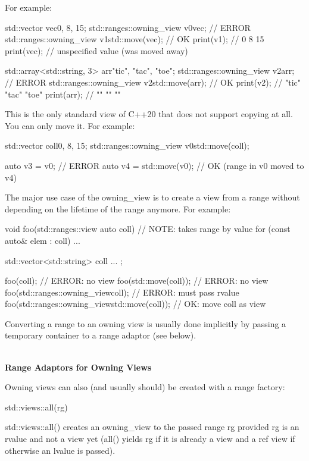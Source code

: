 For example:

\begin{cpp}
std::vector vec{0, 8, 15};
std::ranges::owning_view v0{vec}; // ERROR
std::ranges::owning_view v1{std::move(vec)}; // OK
print(v1); // 0 8 15
print(vec); // unspecified value (was moved away)

std::array<std::string, 3> arr{"tic", "tac", "toe"};
std::ranges::owning_view v2{arr}; // ERROR
std::ranges::owning_view v2{std::move(arr)}; // OK
print(v2); // "tic" "tac" "toe"
print(arr); // "" "" ""
\end{cpp}

This is the only standard view of C++20 that does not support copying at all. You can only move it. For example:

\begin{cpp}
std::vector coll{0, 8, 15};
std::ranges::owning_view v0{std::move(coll)};

auto v3 = v0; // ERROR
auto v4 = std::move(v0); // OK (range in v0 moved to v4)
\end{cpp}

The major use case of the owning\_view is to create a view from a range without depending on the lifetime of the range anymore. For example:

\begin{cpp}
void foo(std::ranges::view auto coll) // NOTE: takes range by value
{
	for (const auto& elem : coll) {
		...
	}
}

std::vector<std::string> coll{ ... };

foo(coll); // ERROR: no view
foo(std::move(coll)); // ERROR: no view
foo(std::ranges::owning_view{coll}); // ERROR: must pass rvalue
foo(std::ranges::owning_view{std::move(coll)}); // OK: move coll as view
\end{cpp}

Converting a range to an owning view is usually done implicitly by passing a temporary container to a range adaptor (see below).

\noindent
\hspace*{\fill} \\ %
\textbf{Range Adaptors for Owning Views}

Owning views can also (and usually should) be created with a range factory:

\begin{cpp}
std::views::all(rg)
\end{cpp}

std::views::all() creates an owning\_view to the passed range rg provided rg is an rvalue and not a view yet (all() yields rg if it is already a view and a ref view if otherwise an lvalue is passed).

